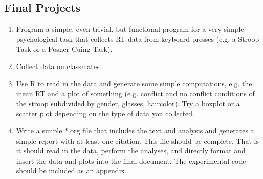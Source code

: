 \documentclass{article}
\begin{document}
\subsection{Final Projects}
\label{sec:org861436e}
\begin{enumerate}
\item Program a simple, even trivial, but functional program for a very simple psychological task that collects RT data from keyboard presses (e.g. a Stroop Task or a Posner Cuing Task).
\item Collect data on classmates
\item Use R to read in the data and generate some simple computations, e.g. the mean RT and a plot of something (e.g. conflict and no conflict conditions of the stroop subdivided by gender, glasses, haircolor). Try a boxplot or a scatter plot depending on the type of data you collected.
\item Write a simple *.org file that includes the text and analysis and generates a simple report with at least one citation. This file should be complete. That is it should read in the data, perform the analyses, and directly format and insert the data and plots into the final document. The experimental code should be included as an appendix.
\end{enumerate}
\end{document}
